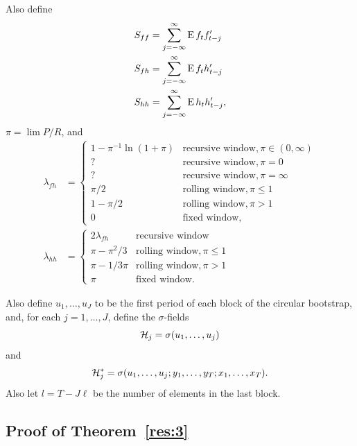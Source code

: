 \documentclass[12pt,fleqn]{article}
\begin{document}
Also define
\begin{align*}
  S_{ff} &= \sum_{j=-\infty}^\infty \operatorname{E} f_t f_{t-j}' \\
  S_{fh} &= \sum_{j=-\infty}^\infty \operatorname{E} f_t h_{t-j}' \\
  S_{hh} &= \sum_{j=-\infty}^\infty \operatorname{E} h_t h_{t-j}',
\end{align*}
$\pi = \lim P/R$, and
\begin{align*}
  \lambda_{fh} &=
  \begin{cases}
    1 - \pi^{-1} \ln(1 + \pi) & \text{recursive window}, \pi \in (0, \infty) \\
    ?                        & \text{recursive window}, \pi = 0 \\
    ?                        & \text{recursive window}, \pi = \infty \\
    \pi / 2 & \text{rolling window}, \pi \leq 1 \\
    1 - \pi / 2 & \text{rolling window}, \pi > 1 \\
    0 & \text{fixed window},
  \end{cases} \\
  \lambda_{hh} &=
  \begin{cases}
    2 \lambda_{fh} & \text{recursive window} \\
    \pi - \pi^2/3 & \text{rolling window}, \pi \leq 1 \\
    \pi - 1/3\pi & \text{rolling window} , \pi > 1 \\
    \pi & \text{fixed window}.
  \end{cases}
\end{align*}

Also define $u_1,\dots,u_J$ to be the first period of each
block of the circular bootstrap, and, for each $j = 1,\dots,J$,
define the $\sigma$-fields
\[
\mathcal{H}_j = \sigma(u_1,\dots,u_j)
\]
and
\[
\mathcal{H}_j^* = \sigma(u_1,\dots,u_j; y_1,\dots,y_T; x_1,\dots,x_T).
\]
Also let $l = T - J \ell$ be the number of elements in the last block.

\newcommand{\WesA}[1][]{\oclt{t}
  (F_t^{#1} - \E^{#1} F_t^{#1}) B^{#1} H_t^{#1}}
\newcommand{\WesB}[1][]{\tfrac{1}{\sqrt{P}} \E^{#1} F_t^{#1} \osum{t} (B_t^{#1} -
  B^{#1}) H_t^{#1}}
\newcommand{\WesC}[1][]{\oclt{t}
  (F_t^{#1} - \E^{#1} F_t^{#1}) (B_t^{#1} - B^{#1}) H_t^{#1}}

\subsection*{Proof of Theorem~\ref{res:3}}
\end{document}
